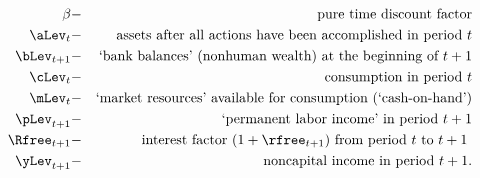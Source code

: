   \begin{eqnarray*}
    {\DiscAlt} & - & \text{pure time discount factor} \\
    {\aLev}_{t} & - & \text{assets after all actions have been accomplished in period $t$} \\
    {\bLev}_{t+1} & - & \text{`bank balances' (nonhuman wealth) at the beginning of $t+1$} \\
    {\cLev}_{t} & - & \text{consumption in period $t$} \\
    {\mLev}_{t} & - & \text{`market resources' available for consumption (`cash-on-hand')} \\
    \pLev_{t+1} & - & \text{`permanent labor income' in period $t+1$} \\
    \Rfree_{t+1} & - & \text{interest factor $(1+\rfree_{t+1})$ from period $t$ to $t+1$ } \\
    {\yLev}_{t+1} & - & \text{noncapital income in period $t+1$}.
  \end{eqnarray*}
